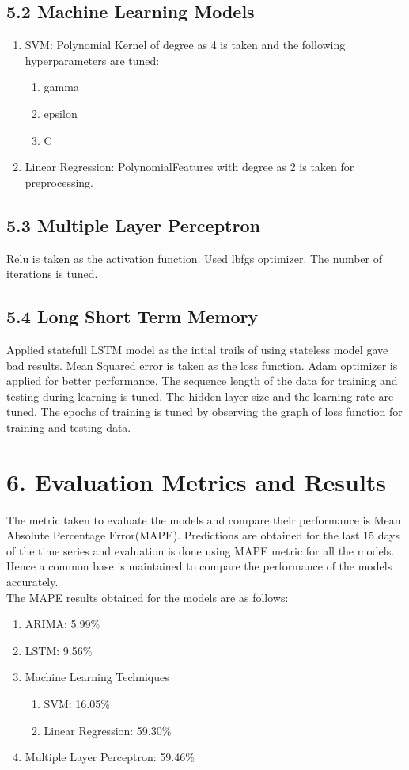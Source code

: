 \documentclass{cup-ino}
\begin{document}
\subsection{5.2 Machine Learning Models}
\begin{enumerate}
    \item SVM:
Polynomial Kernel of degree as 4 is taken and the following hyperparameters are tuned:
    \begin{enumerate}
            \item gamma
            \item epsilon
            \item C
        \end{enumerate}
    \item Linear Regression:
PolynomialFeatures with degree as 2 is taken for preprocessing.
    \end{enumerate}
    
\subsection{5.3 Multiple Layer Perceptron}
Relu is taken as the activation function.
Used lbfgs optimizer.
The number of iterations is tuned.

\subsection{5.4 Long Short Term Memory }
Applied statefull LSTM model as the intial trails of using stateless model gave bad results.
Mean Squared error is taken as the loss function.
Adam optimizer is applied for better performance.
The sequence length of the data for training and testing during learning is tuned.
The hidden layer size and the learning rate are tuned.
The epochs of training is tuned by observing the graph of loss function for training and testing data.

\section{6. Evaluation Metrics and Results}
The metric taken to evaluate the models and compare their performance is Mean Absolute Percentage Error(MAPE).
Predictions are obtained for the last 15 days of the time series and evaluation is done using MAPE metric for all the models.
\\
Hence a common base is maintained to compare the performance of the models accurately.
\\
The MAPE results obtained for the models are as follows:
\begin{enumerate}
    \item ARIMA: 5.99\%
    \item LSTM: 9.56\%
    \item Machine Learning Techniques
        \begin{enumerate}
            \item SVM: 16.05\%
            \item Linear Regression: 59.30\%
        \end{enumerate}
    \item Multiple Layer Perceptron: 59.46\%
\end{enumerate}
\end{document}
